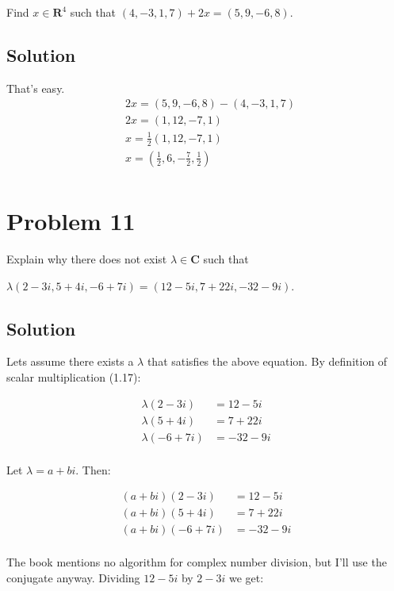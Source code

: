 \documentclass{article}
\begin{document}
Find $x\in\mathbf{R}^{4}$ such that $(4, -3, 1, 7) + 2x = (5, 9, -6, 8)$.

\subsection*{Solution}

That's easy.
\begin{align*}
&2x=(5, 9, -6, 8)-(4, -3, 1, 7) \\
&2x=(1,12,-7,1) \\
&x=\frac{1}{2}(1,12,-7,1) \\
&x=(\frac{1}{2}, 6, -\frac{7}{2}, \frac{1}{2}) \\
\end{align*}

\section*{Problem 11}

Explain why there does not exist $\lambda\in \mathbf{C}$ such that

\vs

\begin{math}
\lambda(2-3i,5+4i,-6+7i)=(12-5i, 7+22i, -32-9i)
\end{math}.

\subsection*{Solution}

Lets assume there exists a $\lambda$ that satisfies the above equation. By definition of scalar multiplication (1.17):

\begin{align*}
\lambda(2-3i)&=12-5i \\
\lambda(5+4i)&=7+22i \\
\lambda(-6+7i)&=-32-9i \\
\end{align*}

Let $\lambda=a+bi$. Then:

\begin{align*}
(a+bi)(2-3i)&=12-5i \\
(a+bi)(5+4i)&=7+22i \\
(a+bi)(-6+7i)&=-32-9i \\
\end{align*}

The book mentions no algorithm for complex number division, but I'll use the conjugate anyway. Dividing $12-5i$ by $2-3i$ we get:
\end{document}
